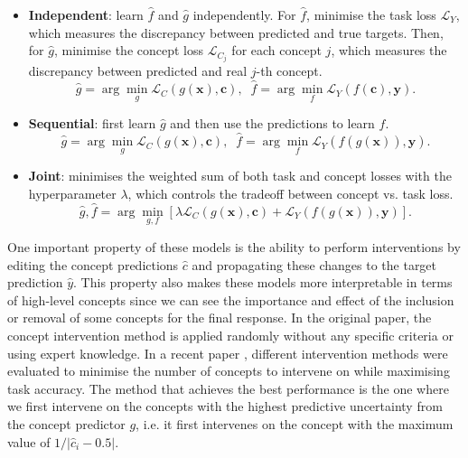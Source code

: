 \begin{itemize}
    \item \textbf{Independent}: learn $\hat f$ and $\hat g$ independently. For $\hat {f} $, minimise the task loss $\mathcal{L}_Y$, 
    which measures the discrepancy between predicted and true targets. Then, for $\hat g$, minimise the concept loss 
    $\mathcal{L}_{C_j}$ for each concept $j$, which measures the discrepancy between predicted and real $j$-th concept. 
    \begin{equation}\label{eq:cbm_independent}
        \hat g = \arg\min_g \mathcal{L}_C(g(\mathbf{x}), \mathbf{c}), \;\; \hat f = \arg\min_f \mathcal{L}_Y(f(\mathbf{c}),\mathbf{y}).
    \end{equation}
    \item \textbf{Sequential}: first learn $\hat g$ and then use the predictions to learn $\hat f$. 
    \begin{equation}\label{eq:cbm_sequential}
        \hat g = \arg\min_g \mathcal{L}_C(g(\mathbf{x}), \mathbf{c}), \;\; \hat f = \arg\min_f \mathcal{L}_Y(f(\hat g(\mathbf{x})),\mathbf{y}).
    \end{equation}
    \item \textbf{Joint}: minimises the weighted sum of both task and concept losses with the hyperparameter $\lambda$, 
    which controls the tradeoff between concept vs. task loss. 
    \begin{equation}\label{eq:cbm_joint}
        \hat g,\hat f = \arg\min_{g,f} \left[ \lambda \mathcal{L}_C(g(\mathbf{x}),\mathbf{c}) + \mathcal{L}_Y(f(g(\mathbf{x})), \mathbf{y}) \right].
    \end{equation}
\end{itemize}
One important property of these models is the ability to perform interventions by editing the concept predictions $\hat c$ and 
propagating these changes to the target prediction $\hat y$. This property also makes these models more interpretable in terms 
of high-level concepts since we can see the importance and effect of the inclusion or removal of some concepts for the final 
response. In the original paper, the concept intervention method is applied randomly without any specific criteria or using 
expert knowledge. In a recent paper \cite{shin2022a}, different intervention methods were evaluated to minimise the number of 
concepts to intervene on while maximising task accuracy. The method that achieves the best performance is the one where we 
first intervene on the concepts with the highest predictive uncertainty from the concept predictor $g$, i.e. it first intervenes 
on the concept with the maximum value of $1 / |\hat c_i - 0.5|$. 


